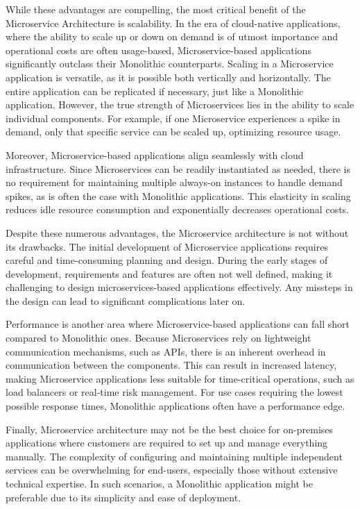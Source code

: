 While these advantages are compelling, the most critical benefit of the Microservice Architecture is scalability. In the era of cloud-native applications, where the ability to scale up or down on demand is of utmost importance and operational costs are often usage-based, Microservice-based applications significantly outclass their Monolithic counterparts. Scaling in a Microservice application is versatile, as it is possible both vertically and horizontally. The entire application can be replicated if necessary, just like a Monolithic application. However, the true strength of Microservices lies in the ability to scale individual components. For example, if one Microservice experiences a spike in demand, only that specific service can be scaled up, optimizing resource usage.

Moreover, Microservice-based applications align seamlessly with cloud infrastructure. Since Microservices can be readily instantiated as needed, there is no requirement for maintaining multiple always-on instances to handle demand spikes, as is often the case with Monolithic applications. This elasticity in scaling reduces idle resource consumption and exponentially decreases operational costs.

Despite these numerous advantages, the Microservice architecture is not without its drawbacks. The initial development of Microservice applications requires careful and time-consuming planning and design. During the early stages of development, requirements and features are often not well defined, making it challenging to design microservices-based applications effectively. Any missteps in the design can lead to significant complications later on.

Performance is another area where Microservice-based applications can fall short compared to Monolithic ones. Because Microservices rely on lightweight communication mechanisms, such as APIs, there is an inherent overhead in communication between the components. This can result in increased latency, making Microservice applications less suitable for time-critical operations, such as load balancers or real-time risk management. For use cases requiring the lowest possible response times, Monolithic applications often have a performance edge.

Finally, Microservice architecture may not be the best choice for on-premises applications where customers are required to set up and manage everything manually. The complexity of configuring and maintaining multiple independent services can be overwhelming for end-users, especially those without extensive technical expertise. In such scenarios, a Monolithic application might be preferable due to its simplicity and ease of deployment\cite{whenmicroarebad}.

